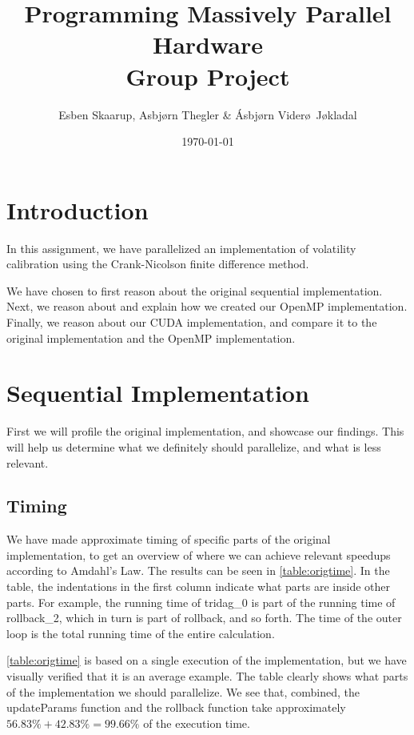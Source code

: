 \documentclass[11pt]{article}
\def\Title{Programming Massively Parallel Hardware\\
\vspace{1.5cm}
\textbf{Group Project}}
\def\Author{Esben Skaarup, Asbj\o rn Thegler \& \'{A}sbj\o rn Vider\o \ J\o kladal}
\begin{document}
\title{\Title}
\author{\Author}
\date{\today}
\maketitle

\section{Introduction}
In this assignment, we have parallelized an implementation of volatility calibration using the Crank-Nicolson finite difference method.

We have chosen to first reason about the original sequential implementation. 
Next, we reason about and explain how we created our OpenMP 
implementation. Finally, we reason about our CUDA implementation, and compare
it to the original implementation and the OpenMP implementation.

\section{Sequential Implementation}
First we will profile the original implementation, and showcase our findings.
This will help us determine what we definitely should parallelize, and what is
less relevant.

\subsection{Timing}
We have made approximate timing of specific parts of the original 
implementation, to get an overview 
of where we can achieve relevant speedups according to Amdahl's Law. The results
can be seen in \autoref{table:origtime}. In the table, the indentations 
in the first column indicate what parts are inside other parts. For example,
the running time of tridag\_0 is part of the running time of rollback\_2, which
in turn is part of rollback, and so forth. The time of the outer loop is the 
total running time of the entire calculation. 

\autoref{table:origtime} is based on a single execution of the implementation, 
but we have visually verified that it is an average example. 
The table clearly shows what parts of the implementation we should parallelize.
We see that, combined, the updateParams function and the rollback function take approximately $56.83\%+42.83\%=99.66\%$ of the execution time.
\end{document}
